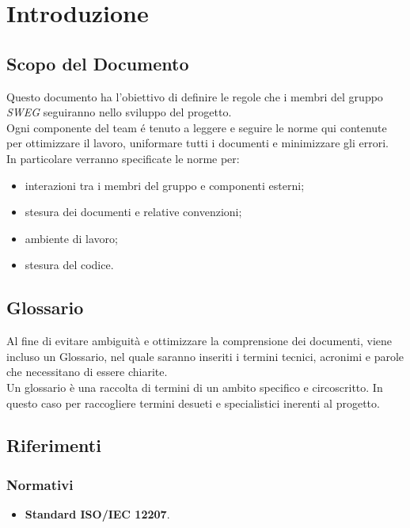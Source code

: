 \documentclass[12pt,a4paper,titlepage]{article}
\begin{document}
\tableofcontents
\thispagestyle{empty}

\newpage



\section{Introduzione}
	\subsection{Scopo del Documento}
	Questo documento ha l'obiettivo di definire le regole che i membri del gruppo \textit{SWEG} seguiranno nello sviluppo del progetto.\\
	Ogni componente del team é tenuto a leggere e seguire le norme qui contenute per ottimizzare il lavoro, uniformare tutti i documenti e minimizzare gli errori.\\
	In particolare verranno specificate le norme per:
\begin{itemize}
\item interazioni tra i membri del gruppo e componenti esterni;
\item stesura dei documenti e relative convenzioni;
\item ambiente di lavoro;
\item stesura del codice.
\end{itemize}

\subsection{Glossario}
Al fine di evitare ambiguità e ottimizzare la comprensione dei documenti, viene incluso un Glossario, nel quale saranno inseriti i termini tecnici, acronimi e parole che necessitano di essere chiarite.\\
Un glossario è una raccolta di termini di un ambito specifico e circoscritto. In questo caso per raccogliere termini desueti e specialistici inerenti al progetto. 

\subsection{Riferimenti}
\subsubsection{Normativi}
\begin{itemize}
	\item \textbf{Standard ISO/IEC 12207}.
\end{itemize}
\end{document}
